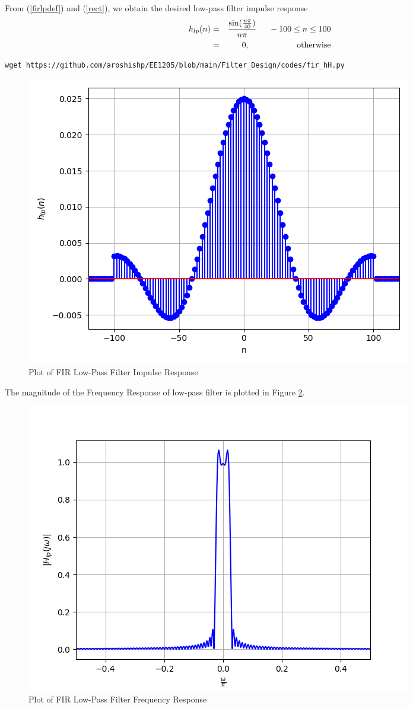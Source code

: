 \documentclass{article}
\begin{document}
From (\ref{firlpdef}) and (\ref{rect}), we obtain the desired low-pass filter impulse response
\begin{eqnarray}
\label{firlpfinal}
h_{lp}(n) &=& \frac{\sin(\frac{n\pi}{40})}{n\pi} \indent -100 \leq n \leq 100 \nonumber \\
&=& 0, \hspace{2cm} \mbox{otherwise}
\end{eqnarray}
\begin{lstlisting}[caption = {Code for Figure 6 and 7}]
wget https://github.com/aroshishp/EE1205/blob/main/Filter_Design/codes/fir_hH.py
\end{lstlisting}
\begin{figure}[!h]
    \centering
    \includegraphics[width = \columnwidth]{figs/fir_hlp.png}
    \caption{Plot of FIR Low-Pass Filter Impulse Response}
    \label{fig:6}
\end{figure}

The magnitude of the Frequency Response of low-pass filter is plotted in Figure \ref{fig:7}.

\begin{figure}[!h]
    \centering
    \includegraphics[width = \columnwidth]{figs/firHLP.png}
    \caption{Plot of FIR Low-Pass Filter Frequency Response}
    \label{fig:7}
\end{figure}
\end{document}
